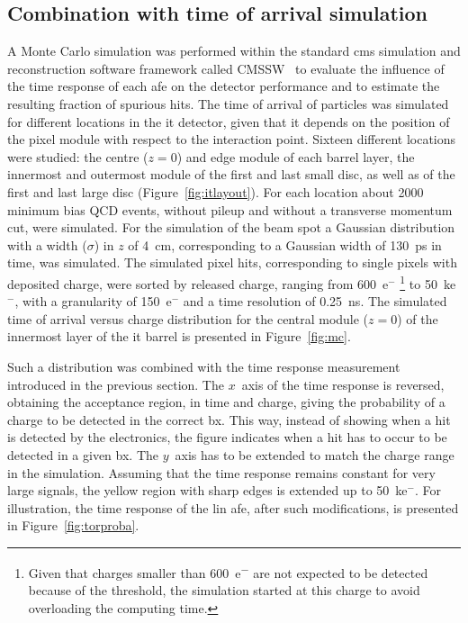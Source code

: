 \subsection*{Combination with time of arrival simulation}

A Monte Carlo simulation was performed within the standard \gls{cms} simulation and reconstruction software framework called CMSSW~\citep{cmssw} to evaluate the influence of the time response of each \gls{afe} on the detector performance and to estimate the resulting fraction of spurious hits. The time of arrival of particles was simulated for different locations in the \gls{it} detector, given that it depends on the position of the pixel module with respect to the interaction point. Sixteen different locations were studied: the centre ($z=0$) and edge module of each barrel layer, the innermost and outermost module of the first and last small disc, as well as of the first and last large disc (Figure~\ref{fig:itlayout}). For each location about \num{2000} minimum bias QCD events, without pileup and without a transverse momentum cut, were simulated. For the simulation of the beam spot a Gaussian distribution with a width ($\sigma$) in $z$ of \SI{4}{\centi\meter}, corresponding to a Gaussian width of \SI{130}{\pico\second} in time, was simulated.
The simulated pixel hits, corresponding to single pixels with deposited charge, were sorted by released charge, ranging from \num{600}~e${^{-}}$ \footnote{Given that charges smaller than \SI{600}{e^-} are not expected to be detected because of the threshold, the simulation started at this charge to avoid overloading the computing time.} to \num{50}~ke${^{-}}$, with a granularity of \num{150}~e${^{-}}$ and a time resolution of \SI{0.25}{\nano\second}. The simulated time of arrival versus charge distribution for the central module ($z=0$) of the innermost layer of the \gls{it} barrel is presented in Figure~\ref{fig:mc}.

Such a distribution was combined with the time response measurement introduced in the previous section.
The \hbox{$x$ axis} of the time response is reversed, obtaining the acceptance region, in time and charge, giving the probability of a charge to be detected in the correct \gls{bx}. This way, instead of showing when a hit is detected by the electronics, the figure indicates when a hit has to occur to be detected in a given \gls{bx}.
The \hbox{$y$ axis} has to be extended to match the charge range in the simulation. Assuming that the time response remains constant for very large signals, the yellow region with sharp edges is extended up to \num{50}~ke${^{-}}$.
For illustration, the time response of the \gls{lin} \gls{afe}, after such modifications, is presented in Figure~\ref{fig:torproba}.

